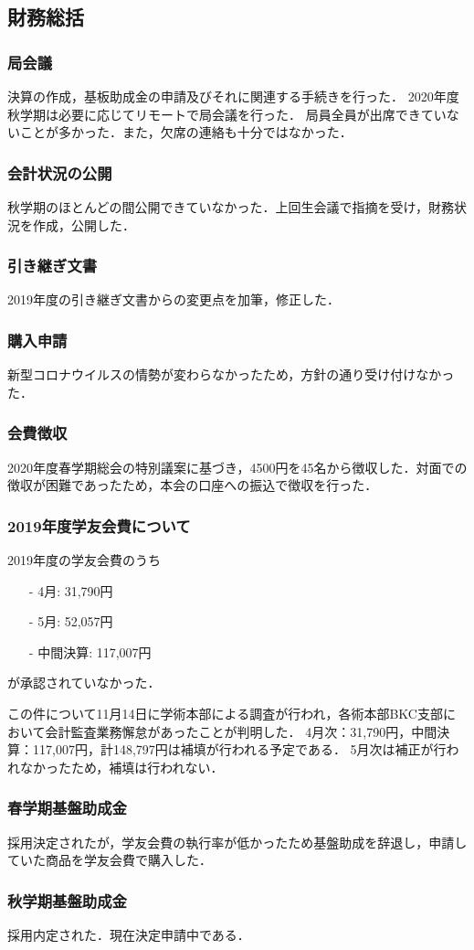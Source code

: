 \subsection*{財務総括}


\subsubsection*{局会議}
決算の作成，基板助成金の申請及びそれに関連する手続きを行った．
2020年度秋学期は必要に応じてリモートで局会議を行った．
局員全員が出席できていないことが多かった．また，欠席の連絡も十分ではなかった．


\subsubsection*{会計状況の公開}
秋学期のほとんどの間公開できていなかった．上回生会議で指摘を受け，財務状況を作成，公開した．


\subsubsection*{引き継ぎ文書}
2019年度の引き継ぎ文書からの変更点を加筆，修正した．


\subsubsection*{購入申請}
新型コロナウイルスの情勢が変わらなかったため，方針の通り受け付けなかった．


\subsubsection*{会費徴収}
2020年度春学期総会の特別議案に基づき，4500円を45名から徴収した．対面での徴収が困難であったため，本会の口座への振込で徴収を行った．


\subsubsection*{2019年度学友会費について}
2019年度の学友会費のうち
\begin{itemize}
	\item[-] 4月: 31,790円
	\item[-] 5月: 52,057円
	\item[-] 中間決算: 117,007円
\end{itemize} 
が承認されていなかった．

この件について11月14日に学術本部による調査が行われ，各術本部BKC支部において会計監査業務懈怠があったことが判明した．
4月次：31,790円，中間決算：117,007円，計148,797円は補填が行われる予定である．
5月次は補正が行われなかったため，補填は行われない．


\subsubsection*{春学期基盤助成金}
採用決定されたが，学友会費の執行率が低かったため基盤助成を辞退し，申請していた商品を学友会費で購入した．


\subsubsection*{秋学期基盤助成金}
採用内定された．現在決定申請中である．
